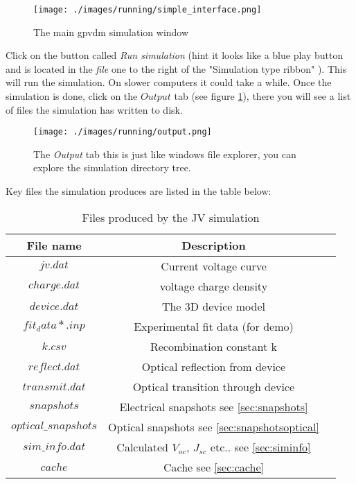 \begin{figure}[H]
\centering
\texttt{[image: ./images/running/simple\_interface.png]}
\caption{The main gpvdm simulation window}
\label{fig:simpleinterface}
\end{figure}

Click on the button called \emph{Run simulation} (hint it looks like a blue play button and is located in the \emph{file} one to the right of the "Simulation type ribbon" ).  This will run the simulation.  On slower computers it could take a while. Once the simulation is done, click on the $Output$ tab (see figure \ref{fig:output}), there you will see a list of files the simulation has written to disk.


\begin{figure}[H]
\centering
\texttt{[image: ./images/running/output.png]}
\caption{The \emph{Output} tab this is just like windows file explorer, you can explore the simulation directory tree.}
\label{fig:output}
\end{figure}

Key files the simulation produces are listed in the table below:

\begin{table}[H]
\begin{center}
\begin{tabular}{ |c|c|c| } 
 \hline
	File name 			& 	Description  \\ 
 \hline
	$jv.dat$ 			&	Current voltage curve \\ 
	$charge.dat$ 		&	voltage charge density\\ 
	$device.dat$ 		&	The 3D device model\\ 
	$fit_data*.inp$ 	&	Experimental fit data (for demo)\\
	$k.csv$ 			&	Recombination constant k\\ 
	$reflect.dat$ 		&	Optical reflection from device\\ 
	$transmit.dat$ 		&	Optical transition through device\\ 
	$snapshots$ 		&	Electrical snapshots see \ref{sec:snapshots}\\
	$optical\_snapshots$&	Optical snapshots see \ref{sec:snapshotsoptical} \\
	$sim\_info.dat$ 	&	Calculated $V_{oc}$, $J_{sc}$ etc.. see \ref{sec:siminfo}   \\
	$cache$ 			&	Cache see \ref{sec:cache}  \\
 \hline
\end{tabular}
\caption{Files produced by the JV simulation}
\label{fig:output}
\end{center}
\end{table}

